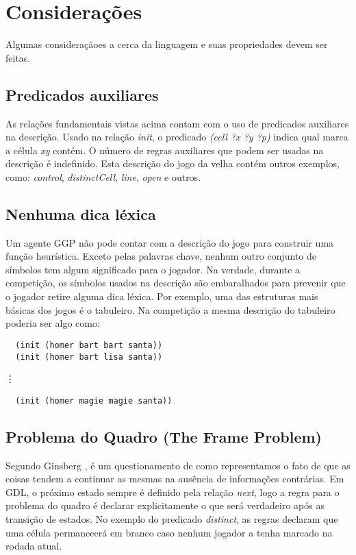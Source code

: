 \section{Considerações}
Algumas consideraçãoes a cerca da linguagem e suas propriedades devem ser feitas.

\subsection{Predicados auxiliares}
As relações fundamentais vistas acima contam com o uso de predicados auxiliares na descrição. Usado na relação \textit{init}, o predicado \textit{(cell ?x ?y ?p)} indica qual marca a célula \textit{xy} contém. O número de regras auxiliares que podem ser usadas na descrição é indefinido. Esta descrição do jogo da velha contém outros exemplos, como: \textit{control}, \textit{distinctCell}, \textit{line}, \textit{open} e outros.

\subsection{Nenhuma dica léxica}
Um agente GGP não pode contar com a descrição do jogo para construir uma função heurística. Exceto pelas palavras chave, nenhum outro conjunto de símbolos tem algum significado para o jogador. Na verdade, durante a competição, os símbolos usados na descrição são embaralhados para prevenir que o jogador retire alguma dica léxica. Por exemplo, uma das estruturas mais básicas dos jogos é o tabuleiro. Na competição a mesma descrição do tabuleiro poderia ser algo como:
\begin{verbatim}                                                                                         
  (init (homer bart bart santa))                                                                                    
  (init (homer bart lisa santa))                                                                                    
\end{verbatim}
	\hspace{1.5cm} {\LARGE{ \vdots }}
\begin{verbatim}	
  (init (homer magie magie santa))                                                                                                                                                           
\end{verbatim}

\subsection{Problema do Quadro (The Frame Problem)}
Segundo Ginsberg \cite{mginsberg},  é um questionamento de como representamos o fato de que as coisas tendem a continuar as mesmas na ausência de informações contrárias. Em GDL, o próximo estado sempre é definido pela relação \textit{next}, logo a regra para o problema do quadro é declarar explicitamente o que será verdadeiro após as transição de estados. 
No exemplo do predicado \textit{distinct}, as regras declaram que uma célula permanecerá em branco caso nenhum jogador a tenha marcado na rodada atual. 

